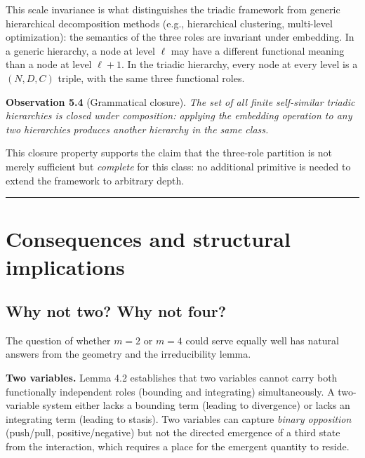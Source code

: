 \documentclass[12pt]{article}
\begin{document}
This scale invariance is what distinguishes the triadic framework from
generic hierarchical decomposition methods (e.g., hierarchical
clustering, multi-level optimization): the semantics of the three roles
are invariant under embedding. In a generic hierarchy, a node at level
\(\ell\) may have a different functional meaning than a node at level
\(\ell+1\). In the triadic hierarchy, every node at every level is a
\((N, D, C)\) triple, with the same three functional roles.

\textbf{Observation 5.4} (Grammatical closure). \emph{The set of all
finite self-similar triadic hierarchies is closed under composition:
applying the embedding operation to any two hierarchies produces another
hierarchy in the same class.}

This closure property supports the claim that the three-role partition
is not merely sufficient but \emph{complete} for this class: no
additional primitive is needed to extend the framework to arbitrary
depth.

\begin{center}\rule{0.5\linewidth}{0.5pt}\end{center}

\section{Consequences and structural implications}\label{consequences-and-structural-implications}

\subsection{Why not two? Why not four?}\label{why-not-two-why-not-four}

The question of whether \(m = 2\) or \(m = 4\) could serve equally well
has natural answers from the geometry and the irreducibility lemma.

\textbf{Two variables.} Lemma 4.2 establishes that two variables cannot
carry both functionally independent roles (bounding and integrating)
simultaneously. A two-variable system either lacks a bounding term
(leading to divergence) or lacks an integrating term (leading to
stasis). Two variables can capture \emph{binary opposition} (push/pull,
positive/negative) but not the directed emergence of a third state from
the interaction, which requires a place for the emergent quantity to
reside.
\end{document}

